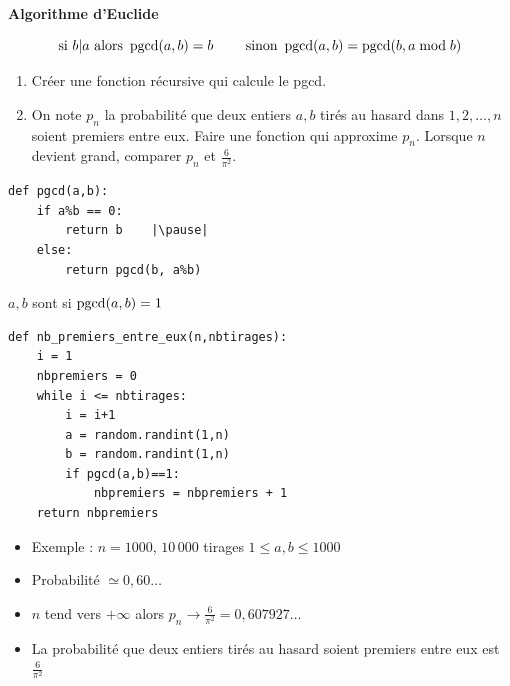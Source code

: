 \begin{frame}

\hfill\hfill\textbf{Algorithme d'Euclide}

$$\text{si } b | a \text{ alors } \mathop{\text{pgcd}}\nolimits(a,b)=b  \qquad \text{ sinon } \mathop{\text{pgcd}}\nolimits(a,b) = \mathop{\text{pgcd}}\nolimits(b, a \bmod b)$$

\pause

\begin{tp}
\begin{enumerate}
  \item Créer une fonction récursive  qui calcule le pgcd.
  \item On note $p_n$ la probabilité que deux entiers $a,b$ tirés au hasard dans 
  ${1,2,\ldots,n}$ soient premiers entre eux. Faire une fonction qui approxime $p_n$.
  Lorsque $n$ devient grand, comparer $p_n$ et $\frac{6}{\pi^2}$.
\end{enumerate}  
\end{tp}

\end{frame}


\begin{frame}[fragile]

\begin{algo}[arith.py (1)]
\begin{lstlisting}
def pgcd(a,b):
    if a%b == 0:
        return b    |\pause|
    else:
        return pgcd(b, a%b)
\end{lstlisting}  
\end{algo}
\end{frame}

\begin{frame}[fragile]

\centerline{$a,b$ sont  si $\mathop{\text{pgcd}}\nolimits(a,b)=1$}

\pause

\begin{algo}[arith.py (2)]
\small
\begin{lstlisting}
def nb_premiers_entre_eux(n,nbtirages):
    i = 1
    nbpremiers = 0
    while i <= nbtirages:
        i = i+1
        a = random.randint(1,n)
        b = random.randint(1,n)
        if pgcd(a,b)==1:
            nbpremiers = nbpremiers + 1
    return nbpremiers
\end{lstlisting}  
\end{algo}

\pause

\begin{itemize}
  \item Exemple : $n=1000$, $10\,000$ tirages $1 \le a,b \le 1000$
\pause  
  \item Probabilité  $\simeq 0,60\ldots$
\pause  
  \item $n$ tend vers $+\infty$ alors $p_n \to \frac{6}{\pi^2} = 0,607927\ldots$ 
\pause  
  \item \og La probabilité que deux entiers tirés au hasard soient premiers entre eux est $\frac{6}{\pi^2}$ \fg
\end{itemize}

\end{frame}


